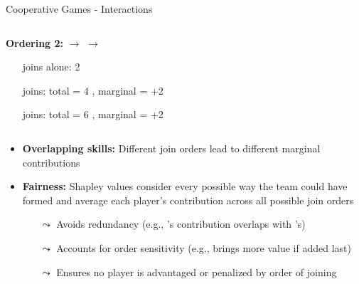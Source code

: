 \documentclass[11pt,compress,t,notes=noshow, aspectratio=169, xcolor=table]{beamer}
\begin{document}
\begin{frame}{Cooperative Games - Interactions}
\begin{columns}[T, totalwidth=\linewidth]
\begin{column}{0.5\textwidth}
\textbf{Ordering 2:} \textcolor{playeryellow}{} $\rightarrow$ \textcolor{playerred}{} $\rightarrow$ \textcolor{playerblue}{}
\begin{itemize}
  \item[\textcolor{playeryellow}{\scalebox{1}{\ding{108}}}] joins alone: 2 
  \item[\textcolor{playerred}{\scalebox{1}{\ding{108}}}] joins: total = 4 , marginal = +2
  \item[\textcolor{playerblue}{\scalebox{1}{\ding{108}}}] joins: total = 6 , marginal = +2
\end{itemize}
    \end{column}
\end{columns}
\pause
\begin{itemize}
  \item \textbf{Overlapping skills:} Different join orders lead to different marginal contributions
  \item \textbf{Fairness:} Shapley values consider every possible way the team could have formed and average each player's contribution across all possible join orders
  \begin{itemize}
    \item[$\leadsto$] Avoids redundancy (e.g., \textcolor{playerblue}{}’s contribution overlaps with \textcolor{playerred}{}’s)
    \item[$\leadsto$] Accounts for order sensitivity (e.g., \textcolor{playerred}{} brings more value if added last)
    \item[$\leadsto$] Ensures no player is advantaged or penalized by order of joining%
  \end{itemize}
\end{itemize}
\end{frame}
\end{document}
